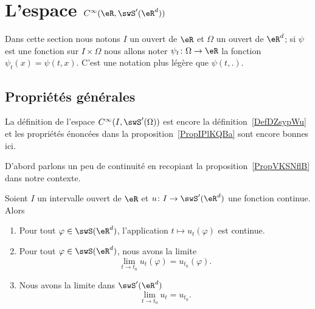 \section{L'espace \texorpdfstring{\(   C^{\infty}(\eR,\swS'(\eR^d))\)}{C(R,S')}}

Dans cette section nous notons \( I\) un ouvert de \( \eR\) et \( \Omega\) un ouvert de \( \eR^d\); si \( \psi\) est une fonction sur \( I\times \Omega\) nous allons noter \( \psi_t\colon \Omega\to \eR\) la fonction \( \psi_t(x)=\psi(t,x)\). C'est une notation plus légère que \( \psi(t,.)\).

\subsection{Propriétés générales}

La définition de l'espace \(  C^{\infty}(I,\swS'(\Omega))\) est encore la définition~\ref{DefDZsypWu} et les propriétés énoncées dans la proposition~\ref{PropIPlKQBa} sont encore bonnes ici.

D'abord parlons un peu de continuité en recopiant la proposition~\ref{PropVKSNflB} dans notre contexte.
\begin{proposition}     \label{PropBXFmvPs}
	Soient \( I\) un intervalle ouvert de \( \eR\) et \( u\colon I\to \swS'(\eR^d)\) une fonction continue. Alors
	\begin{enumerate}
		\item   \label{ItemFTvVUEW}
		      Pour tout \( \varphi\in\swS(\eR^d)\), l'application \( t\mapsto u_t(\varphi)\) est continue.
		\item
		      Pour tout \( \varphi\in\swS(\eR^d)\), nous avons la limite
		      \begin{equation}
			      \lim_{t\to t_0} u_t(\varphi)=u_{t_0}(\varphi).
		      \end{equation}
		\item
		      Nous avons la limite dans \( \swS'(\eR^d)\)
		      \begin{equation}
			      \lim_{t\to t_0} u_t=u_{t_0}.
		      \end{equation}
	\end{enumerate}
\end{proposition}

